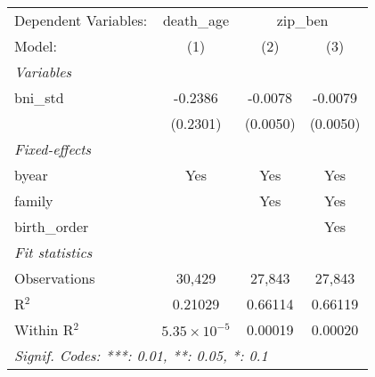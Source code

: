 \begin{tabular}{lccc}
\tabularnewline\midrule\midrule
Dependent Variables: & death\_age & \multicolumn{2}{c}{zip\_ben}\\
Model: & (1) & (2) & (3)\\
\midrule \emph{Variables} &   &   &  \\
bni\_std & -0.2386 & -0.0078 & -0.0079\\
  & (0.2301) & (0.0050) & (0.0050)\\
\midrule \emph{Fixed-effects} &   &   &  \\
byear & Yes & Yes & Yes\\
family &  & Yes & Yes\\
birth\_order &  &  & Yes\\
\midrule \emph{Fit statistics} &   &   &  \\
Observations & 30,429 & 27,843 & 27,843\\
R$^2$ & 0.21029 & 0.66114 & 0.66119\\
Within R$^2$ & $5.35\times 10^{-5}$ & 0.00019 & 0.00020\\
\midrule\midrule\multicolumn{4}{l}{\emph{Signif. Codes: ***: 0.01, **: 0.05, *: 0.1}}\\
\end{tabular}


